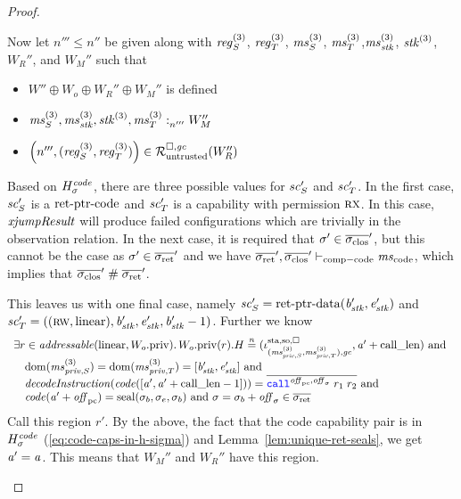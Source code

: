 \begin{proof}
\begin{description}
    Now let $n''' \leq n''$ be given along with $\reg[3]_S$, $\reg[3]_T$, $\ms^{(3)}_S$, $\ms^{(3)}_T$,$\ms^{(3)}_\stk$, $\stk^{(3)}$, $W_R''$, and $W_M''$ such that
    \begin{itemize}
    \item $W'' \oplus W_o \oplus W_R'' \oplus W_M''$ is defined
    \item $\memSat[n''']{\ms^{(3)}_S,\ms^{(3)}_\stk, \stk^{(3)}, \ms^{(3)}_T}{W_M''}$
    \item $\npair[n''']{(\reg[3]_S,\reg[3]_T)} \in \lrr(W_R'')$
    \end{itemize}

    Based on $H_\sigma^\var{code}$, there are three possible values for $\vsc_S'$ and $\vsc_T'$.
    In the first case, $\vsc_S'$ is a $\retptrc$ and $\vsc_T'$ is a capability with permission $\rx$.
    In this case, $\var{xjumpResult}$ will produce failed configurations which are trivially in the observation relation.
    In the next case, it is required that $\sigma' \in \sigcloss'$, but this
    cannot be the case as $\sigma' \in \sigrets'$ and we have $\sigrets',\sigcloss' \vdash_{\mathrm{comp-code}} \mscode$, which implies that $\sigcloss' \mathrel{\#} \sigrets'$.

    This leaves us with one final case, namely $\vsc_S'= \retptrd(\baddr_\stk',\eaddr_\stk')$ and $\vsc_T'=((\rw,\linear),\baddr_\stk',\eaddr_\stk',\baddr_\stk'-1)$.
    Further we know
    \[
      \begin{array}{l}
        \exists r \in \addressable{\linear,\pwpriv[W_o]} \ldotp \pwpriv[W_o](r).H \nequal (\stareg[(\ms_{\priv,S}^{(3)},\ms_{\priv,T}^{(3)}),\gc]{\spao,\square}, \aaddr'+\calllen) \tand \\
        \quad \dom(\ms_{\priv,S}^{(3)}) = \dom(\ms_{\priv,T}^{(3)}) = [\baddr_\stk',\eaddr_\stk'] \tand\\
        \quad \decInstr{\code([\aaddr',\aaddr' + \calllen-1])} = \overline{\scall{\offpc,\offsigma}{r_1}{r_2}} \tand \\
        \quad \code(\aaddr'+\offpc) = \seal{\sigma_b,\sigma_e,\sigma_b} \tand \sigma = \sigma_b + \offsigma \in \sigrets
      \end{array}
    \]
    Call this region $r'$.
    By the above, the fact that the code capability pair is in $H_\sigma^\var{code}$ (\ref{eq:code-caps-in-h-sigma}) and Lemma~\ref{lem:unique-ret-seals}, we get $\aaddr' = \aaddr$.
    This means that $W_M''$ and $W_R''$ have this region.


\end{description}
\end{proof}
